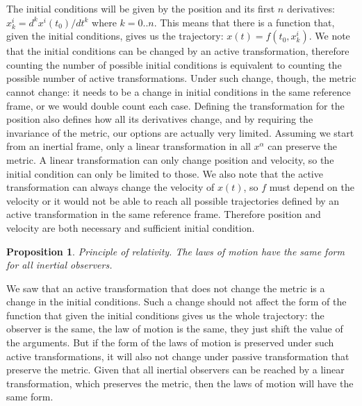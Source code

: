 \documentclass[aps,pra,10pt,twocolumn,floatfix,nofootinbib]{revtex4-1}
\newtheorem{prop}[thm]{Proposition}
\theoremstyle{definition}
\begin{document}
The initial conditions will be given by the position and its first $n$ derivatives: $x^i_k=d^kx^i(t_0)/dt^k$ where $k=0..n$. This means that there is a function that, given the initial conditions, gives us the trajectory: $x(t)=f(t_0, x^i_k)$. We note that the initial conditions can be changed by an active transformation, therefore counting the number of possible initial conditions is equivalent to counting the possible number of active transformations. Under such change, though, the metric cannot change: it needs to be a change in initial conditions in the same reference frame, or we would double count each case. Defining the transformation for the position also defines how all its derivatives change, and by requiring the invariance of the metric, our options are actually very limited. Assuming we start from an inertial frame, only a linear transformation in all $x^\alpha$ can preserve the metric. A linear transformation can only change position and velocity, so the initial condition can only be limited to those. We also note that the active transformation can always change the velocity of $x(t)$, so $f$ must depend on the velocity or it would not be able to reach all possible trajectories defined by an active transformation in the same reference frame. Therefore position and velocity are both necessary and sufficient initial condition.

\begin{prop}
Principle of relativity. The laws of motion have the same form for all inertial observers.
\end{prop}

We saw that an active transformation that does not change the metric is a change in the initial conditions. Such a change should not affect the form of the function that given the initial conditions gives us the whole trajectory: the observer is the same, the law of motion is the same, they just shift the value of the arguments. But if the form of the laws of motion is preserved under such active transformations, it will also not change under passive transformation that preserve the metric. Given that all inertial observers can be reached by a linear transformation, which preserves the metric, then the laws of motion will have the same form.



\end{document}
